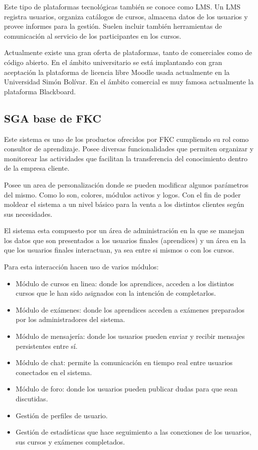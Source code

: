Este tipo de plataformas tecnológicas también se conoce como \gls{LMS}. Un \gls{LMS} registra usuarios, organiza catálogos de cursos, almacena datos de los usuarios y provee informes para la gestión. Suelen incluir también herramientas de comunicación al servicio de los participantes en los cursos. 

Actualmente existe una gran oferta de plataformas, tanto de comerciales como de código abierto. En el ámbito universitario se está implantando con gran aceptación la plataforma de licencia libre Moodle\cite{bib:moodle} usada actualmente en la Universidad Simón Bolívar. En el ámbito comercial es muy famosa actualmente la plataforma Blackboard\cite{bib:blackboard}.

\subsection{\gls{SGA} base de \gls{FKC}}

Este sistema es uno de los productos ofrecidos por FKC cumpliendo su rol como consultor de aprendizaje. Posee diversas funcionalidades que permiten organizar y monitorear las actividades que facilitan la transferencia del conocimiento dentro de la empresa cliente.

Posee un area de personalización donde se pueden modificar algunos parámetros del mismo. Como lo son, colores, módulos activos y logos. Con el fin de poder moldear el sistema a un nivel básico para la venta a los distintos clientes según sus necesidades.

El sistema esta compuesto por un área de administración en la que se manejan los datos que son presentados a los usuarios finales (aprendices) y un área en la que los usuarios finales interactuan, ya sea entre si mismos o con los cursos.

Para esta interacción hacen uso de varios módulos:

\begin{itemize}
	\item Módulo de cursos en linea: donde los aprendices, acceden a los distintos cursos que le han sido asignados con la intención de completarlos.

	\item Módulo de exámenes: donde los aprendices acceden a exámenes preparados por los administradores del sistema.

	\item Módulo de mensajería: donde los usuarios pueden enviar y recibir mensajes persistentes entre sí. 

	\item Módulo de chat: permite la comunicación en tiempo real entre usuarios conectados en el sistema.

	\item Módulo de foro: donde los usuarios pueden publicar dudas para que sean discutidas.

	\item Gestión de perfiles de usuario.

	\item Gestión de estadísticas que hace seguimiento a las conexiones de los usuarios, sus cursos y exámenes completados.
\end{itemize}

